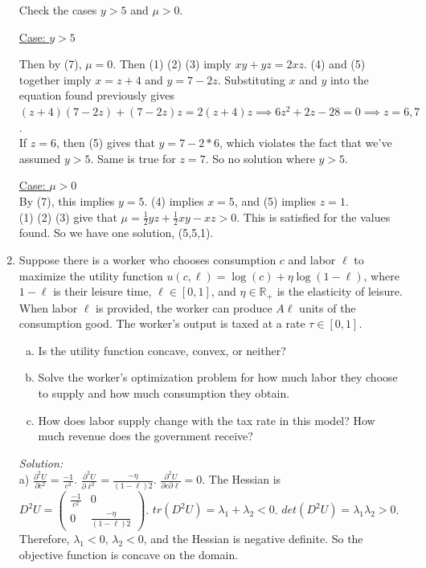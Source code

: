 \documentclass[12pt]{article}
\newif\ifsln
\newcommand{\R}{\mathbb{R}}
\begin{document}
\begin{enumerate}[1.]
Check the cases $y > 5$ and $\mu > 0$. \bigskip

\underline{Case: $y > 5$}\smallskip

Then by (7), $\mu = 0$. Then (1) (2) (3) imply $xy + yz = 2 xz$. (4) and (5) together imply $x = z + 4$ and $y = 7 - 2z$. Substituting $x$ and $y$ into the equation found previously gives $(z+4)(7-2z) + (7-2z)z = 2(z+4)z \implies 6z^2 + 2z - 28 = 0 \implies z = 6, 7$.\\

If $z = 6$, then (5) gives that $y = 7 - 2*6$, which violates the fact that we've assumed $y > 5$. Same is true for $z = 7$. So no solution where $y > 5$.\smallskip

\underline{Case: $\mu > 0$}\\

By (7), this implies $y = 5$. (4) implies $x = 5$, and (5) implies $z = 1$. \\

(1) (2) (3) give that $\mu = \frac{1}{2}yz + \frac{1}{2}xy - xz > 0$. This is satisfied for the values found. So we have one solution, (5,5,1).
\fi



\item Suppose there is a worker who chooses consumption $c$ and labor $\ell$ to maximize the utility function $u(c, \ell) = \log(c) + \eta \log(1- \ell)$, where $1-\ell$ is their leisure time, $\ell \in [0, 1]$, and $\eta \in \R_{+}$ is the elasticity of leisure. When labor $\ell$ is provided, the worker can produce $A\ell$ units of the consumption good. The worker's output is taxed at a rate $\tau\in [0, 1]$. 

	\begin{enumerate}[a)]
		\item Is the utility function concave, convex, or neither?
		\item  Solve the worker's optimization problem for how much labor they choose to supply and how much consumption they obtain.
		\item How does labor supply change with the tax rate in this model? How much revenue does the government receive?
	\end{enumerate}

\ifsln
\textit{Solution:}\\

a) $\frac{\partial^{2} U}{\partial c^{2}} = \frac{-1}{c^{2}}$.  $\frac{\partial^{2} U}{\partial \ell^{2}} = \frac{-\eta}{(1-\ell){2}}$.  $\frac{\partial^{2} U}{\partial c\partial \ell} = 0$. The Hessian is $D^{2}U = \begin{pmatrix}  \frac{-1}{c^{2}} & 0 \\ 0 & \frac{-\eta}{(1-\ell){2}}\end{pmatrix}$.  $tr(D^{2}U) = \lambda_{1} + \lambda_{2} < 0$. $det(D^{2}U) = \lambda_{1}\lambda_{2} > 0$. Therefore, $\lambda_{1} < 0$, $\lambda_{2} < 0$, and the Hessian is negative definite. So the objective function is concave on the domain.\\


\end{enumerate}
\end{document}
